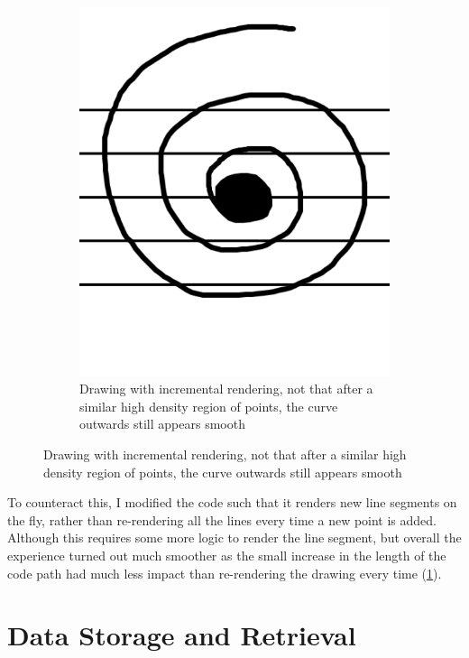 \begin{figure}[hbt                                   ]
\begin{subfigure}[b]{.49\linewidth}
      \includegraphics[width=\linewidth]{gfx/implementation/nolag-stave.png}
      \caption{Drawing with incremental rendering, not that after a similar high density region of points, the curve outwards still appears smooth}
      \label{fig:drawing-lag-smooth}
    \end{subfigure}

  \label{Drawing Lag}

\end{figure}

To counteract this, I modified the code such that it renders new line segments on the fly, rather than re-rendering all the lines every time a new point is added. Although this requires some more logic to render the line segment, but overall the experience turned out much smoother as the small increase in the length of the code path had much less impact than re-rendering the drawing every time (\cref{fig:drawing-lag-smooth}).

\section{Data Storage and Retrieval}

